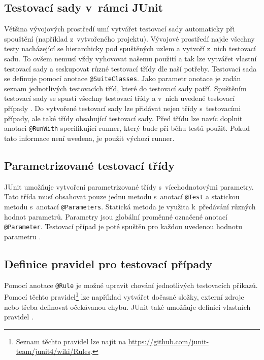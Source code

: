    \subsection{Testovací sady v~rámci JUnit}
    Většina vývojových prostředí umí vytvářet testovací sady automaticky při spouštění (například z~vytvořeného projektu). Vývojové prostředí najde všechny testy nacházející se hierarchicky pod spuštěných uzlem a vytvoří z~nich testovací sadu. To ovšem nemusí vždy vyhovovat našemu použití a tak lze vytvářet vlastní testovací sady a seskupovat různé testovací třídy dle naší potřeby. Testovací sada se definuje pomocí anotace \texttt{@SuiteClasses}. Jako parametr anotace je zadán seznam jednotlivých testovacích tříd, které do testovací sady patří. Spuštěním testovací sady se spustí všechny testovací třídy a v~nich uvedené testovací případy \cite{vogella:JUnit}. Do vytvořené testovací sady lze přidávat nejen třídy s~testovacími případy, ale také třídy obsahující testovací sady. Před třídu lze navíc doplnit anotaci \texttt{@RunWith} specifikující runner, který bude při běhu testů použit. Pokud tato informace není uvedena, je použit výchozí runner.

    \subsection{Parametrizované testovací třídy}
    JUnit umožňuje vytvoření parametrizované třídy s~vícehodnotovými parametry. Tato třída musí obsahovat pouze jednu metodu s~anotací \texttt{@Test} a statickou metodu s~anotací \texttt{@Parameters}. Statická metoda je využita k~předávání různých hodnot parametrů. Parametry jsou globální proměnné označené anotací \texttt{@Parameter}. Testovací případ je poté spuštěn pro každou uvedenou hodnotu parametru \cite{vogella:JUnit}.

    \subsection{Definice pravidel pro testovací případy}
    Pomocí anotace \texttt{@Rule} je možné upravit chování jednotlivých testovacích příkazů. Pomocí těchto pravidel\footnote{Seznam těchto pravidel lze najít na \url{https://github.com/junit-team/junit4/wiki/Rules}.} lze například vytvářet dočasné složky, externí zdroje nebo třeba definovat očekávanou chybu. JUnit také umožňuje definici vlastních pravidel \cite{vogella:JUnit}.

